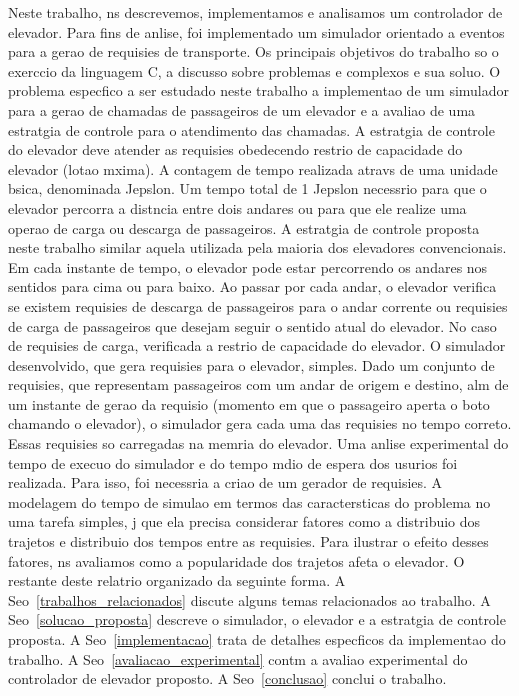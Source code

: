 \documentclass[12pt]{article}
\begin{document}
Neste trabalho, ns descrevemos, implementamos e analisamos um controlador de elevador. Para fins de anlise, foi implementado um simulador orientado a eventos para a gerao de requisies de transporte. Os principais objetivos do trabalho so o exerccio da linguagem C, a discusso sobre problemas e complexos e sua soluo.
O problema especfico a ser estudado neste trabalho  a implementao de um simulador para a gerao de chamadas de passageiros de um elevador e a avaliao de uma estratgia de controle para o atendimento das chamadas. A estratgia de controle do elevador deve atender as requisies obedecendo  restrio de capacidade do elevador (lotao mxima). A contagem de tempo  realizada atravs de uma unidade bsica, denominada Jepslon. Um tempo total de 1 Jepslon  necessrio para que o elevador percorra a distncia entre dois andares ou para que ele realize uma operao de carga ou descarga de passageiros.
A estratgia de controle proposta neste trabalho  similar  aquela utilizada pela maioria dos elevadores convencionais. Em cada instante de tempo, o elevador pode estar percorrendo os andares nos sentidos para cima ou para baixo. Ao passar por cada andar, o elevador verifica se existem requisies de descarga de passageiros para o andar corrente ou requisies de carga de passageiros que desejam seguir o sentido atual do elevador. No caso de requisies de carga,  verificada a restrio de capacidade do elevador.
O simulador desenvolvido, que gera requisies para o elevador,  simples. Dado um conjunto de requisies, que representam passageiros com um andar de origem e destino, alm de um instante de gerao da requisio (momento em que o passageiro aperta o boto chamando o elevador), o simulador gera cada uma das requisies no tempo correto. Essas requisies so carregadas na memria do elevador.
Uma anlise experimental do tempo de execuo do simulador e do tempo mdio de espera dos usurios foi realizada. Para isso, foi necessria a criao de um gerador de requisies. A modelagem do tempo de simulao em termos das caractersticas do problema no  uma tarefa simples, j que ela precisa considerar fatores como a distribuio dos trajetos e distribuio dos tempos entre as requisies. Para ilustrar o efeito desses fatores, ns avaliamos como a popularidade dos trajetos afeta o elevador.
O restante deste relatrio  organizado da seguinte forma. A Seo~\ref{trabalhos_relacionados} discute alguns temas relacionados ao trabalho. A Seo~\ref{solucao_proposta} descreve o simulador, o elevador e a estratgia de controle proposta. A Seo~\ref{implementacao} trata de detalhes especficos da implementao do trabalho. A Seo~\ref{avaliacao_experimental} contm a avaliao experimental do controlador de elevador proposto. A Seo~\ref{conclusao} conclui o trabalho.
\end{document}
